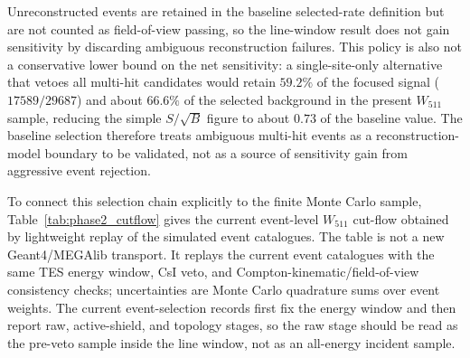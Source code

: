 \documentclass[11pt]{article}
\newcommand{\wii}{W_{511}}
\newcommand{\added}[1]{{\color{red}#1}}
\begin{document}
Unreconstructed events are retained in the baseline selected-rate definition but
are not counted as field-of-view passing, so the line-window result does not gain
sensitivity by discarding ambiguous reconstruction failures. This policy is also
not a conservative lower bound on the net sensitivity: a single-site-only
alternative that vetoes all multi-hit candidates would retain $59.2\%$ of the
focused signal ($17589/29687$) and about $66.6\%$ of the selected background in
the present $\wii$ sample, reducing the simple $S/\sqrt{B}$ figure to about
$0.73$ of the baseline value. The baseline selection therefore treats ambiguous
multi-hit events as a reconstruction-model boundary to be validated, not as a
source of sensitivity gain from aggressive event rejection.

\added{To connect this selection chain explicitly to the finite Monte Carlo
sample, Table~\ref{tab:phase2_cutflow} gives the current event-level
$\wii$ cut-flow obtained by lightweight replay of the simulated event catalogues.
The table is not a new Geant4/MEGAlib transport. It replays the current
event catalogues with the same TES energy window, CsI veto, and
Compton-kinematic/field-of-view consistency checks; uncertainties are Monte
Carlo quadrature sums over event weights. The current event-selection records first fix
the energy window and then report raw, active-shield, and topology stages, so
the raw stage should be read as the pre-veto sample inside the line window, not
as an all-energy incident sample.}
\end{document}
